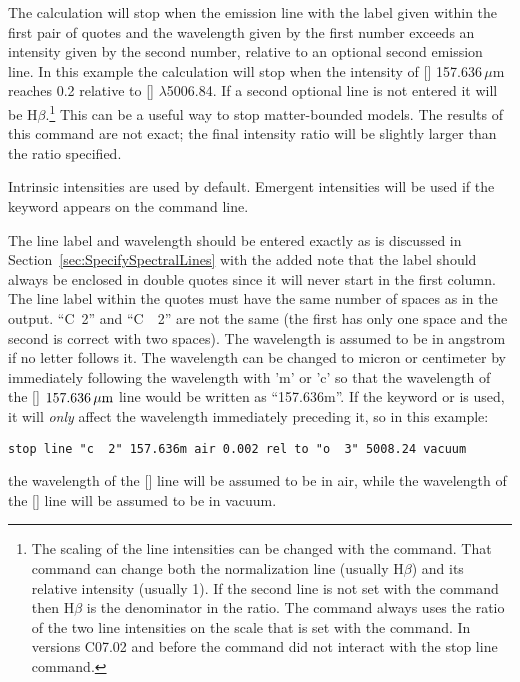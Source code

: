 The calculation will stop when the emission line with the label given
within the first pair of quotes and the wavelength given by
the first number
exceeds an intensity given by the second number, relative to an optional
second emission line.
In this example the calculation will stop when the
intensity of [\cii] 157.636\,$\mu$m reaches 0.2 relative to [\oiii] $\lambda$5006.84.
If a second
optional line is not entered it will be H$\beta$.\footnote{The scaling of the line intensities can be changed with the
command.
That command can change both the
normalization line (usually H$\beta$) and its relative intensity
(usually 1).
If the second line is not set with the  command
then
H$\beta$ is the
denominator in the ratio.
The  command always uses the ratio of
the two line intensities on the scale that is set with the
 command.
In versions C07.02 and before the  command
did not interact with
the stop line command.}
This can be a useful way
to stop matter-bounded models.
The results of this command are not exact;
the final intensity ratio will be slightly larger than the ratio specified.

Intrinsic intensities are used by default.
Emergent intensities will be used if the keyword
 appears on the command line.

The line label and wavelength should be entered exactly as is discussed
in Section~\ref{sec:SpecifySpectralLines} with the added note that the label
should always be enclosed in double quotes since it will never start in the
first column.
The line label within the quotes must have
the same number of spaces as in the output.
``C~2'' and ``C~~2'' are not the same (the first has only one space
and the second is correct with two spaces).
The wavelength is assumed to be in angstrom if no letter
follows it.
The wavelength can be changed to micron or centimeter by immediately
following the wavelength with 'm' or 'c' so that
the wavelength of the [\cii ] $157.636\,\hbox{$\mu$m}$ line would be written as ``157.636m''.
If the keyword  or  is used, it will {\em only}
affect the wavelength immediately preceding it, so in this example:
\begin{verbatim}
stop line "c  2" 157.636m air 0.002 rel to "o  3" 5008.24 vacuum
\end{verbatim}
the wavelength of the [\cii] line will be assumed to be in air, while the wavelength
of the [\oiii] line will be assumed to be in vacuum.

